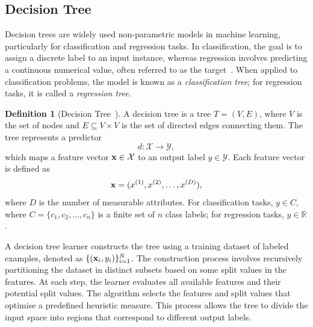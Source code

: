 \documentclass[
]{ceurart}
\theoremstyle{definition}
\newtheorem{definition}{Definition}[section]
\begin{document}
\subsection{Decision Tree}

Decision trees are widely used non-parametric models in machine learning, particularly for classification and regression tasks. In classification, the goal is to assign a discrete label to an input instance, whereas regression involves predicting a continuous numerical value, often referred to as the target~\cite{mlbook}. When applied to classification problems, the model is known as a \textit{classification tree}; for regression tasks, it is called a \textit{regression tree}.

\begin{definition}[Decision Tree~\cite{swantje}]
A decision tree is a tree $T = (V, E)$, where $V$ is the set of nodes and $E \subseteq V \times V$ is the set of directed edges connecting them. The tree represents a predictor
\begin{equation*}
d: \mathcal{X} \rightarrow \mathcal{Y},
\end{equation*}
which maps a feature vector $\vb{x} \in \mathcal{X}$ to an output label $y \in \mathcal{Y}$. Each feature vector is defined as
\begin{equation*}
\vb{x} = (x^{(1)}, x^{(2)}, \ldots, x^{(D)}),
\end{equation*}
where $D$ is the number of measurable attributes. For classification tasks, ${y \in C}$, where $C = \{c_1, c_2, \dots, c_n\}$ is a finite set of $n$ class labels; for regression tasks, $y \in \mathbb{R}$.
\end{definition}

A decision tree learner constructs the tree using a training dataset of labeled examples, denoted as $\{(\vb x_i, y_i)\}^N_{i=1}$. The construction process involves recursively partitioning the dataset in distinct subsets based on some split values in the features. At each step, the learner evaluates all available features and their potential split values. The algorithm selects the features and split values that optimise a predefined heuristic measure. This process allows the tree to divide the input space into regions that correspond to different output labels.
\end{document}
